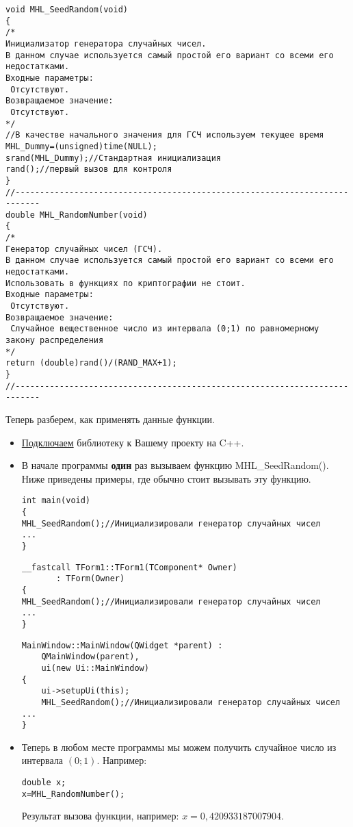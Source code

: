 \documentclass[a4paper,12pt]{article}
\begin{document}
\begin{lstlisting}[label=random_standard,caption=Стандартный вариант по умолчанию]
void MHL_SeedRandom(void)
{
/*
Инициализатор генератора случайных чисел.
В данном случае используется самый простой его вариант со всеми его недостатками.
Входные параметры:
 Отсутствуют.
Возвращаемое значение:
 Отсутствуют.
*/ 
//В качестве начального значения для ГСЧ используем текущее время
MHL_Dummy=(unsigned)time(NULL);
srand(MHL_Dummy);//Стандартная инициализация
rand();//первый вызов для контроля
}
//---------------------------------------------------------------------------
double MHL_RandomNumber(void)
{
/*
Генератор случайных чисел (ГСЧ).
В данном случае используется самый простой его вариант со всеми его недостатками.
Использовать в функциях по криптографии не стоит.
Входные параметры:
 Отсутствуют.
Возвращаемое значение:
 Случайное вещественное число из интервала (0;1) по равномерному закону распределения
*/ 
return (double)rand()/(RAND_MAX+1);
}
//---------------------------------------------------------------------------
\end{lstlisting}

Теперь разберем, как применять данные функции.

\begin{itemize}
\item \hyperref[section_install]{Подключаем} библиотеку к Вашему проекту на C++.
\item В начале программы \textbf{один} раз вызываем функцию MHL\_SeedRandom(). Ниже приведены примеры, где обычно стоит вызывать эту функцию.

\begin{lstlisting}[label=random_console,caption=Применение MHL\_SeedRandom для консольного приложения]
int main(void)
{
MHL_SeedRandom();//Инициализировали генератор случайных чисел
...
} 
\end{lstlisting}

\begin{lstlisting}[label=random_cbuilder,caption=Применение MHL\_SeedRandom для C++Builder]
__fastcall TForm1::TForm1(TComponent* Owner)
       : TForm(Owner)
{
MHL_SeedRandom();//Инициализировали генератор случайных чисел
...
}
\end{lstlisting}

\begin{lstlisting}[label=random_qt,caption=Применение MHL\_SeedRandom для Qt]
MainWindow::MainWindow(QWidget *parent) :
    QMainWindow(parent),
    ui(new Ui::MainWindow)
{
    ui->setupUi(this);
    MHL_SeedRandom();//Инициализировали генератор случайных чисел
...
}
\end{lstlisting}

\item Теперь в любом месте программы мы можем получить случайное число из интервала $ \left(0; 1\right)  $. Например:

\begin{lstlisting}[label=random_use,caption=Применение ГСЧ]
double x;
x=MHL_RandomNumber();
\end{lstlisting}

Результат вызова функции, например: $ x = 0,420933187007904 $.

\end{itemize}
\end{document}
